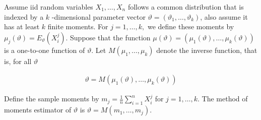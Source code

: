 \documentclass[ 11pt,%
				a4paper,%
				twoside,%
				headinclude,%
				footinclude = true,%
				cleardoublepage = empty,%
				reqno]{scrbook}
\begin{document}

  

\begin{definition}

Assume iid random variables $X_{1}, \ldots, X_{n}$ follows a common distribution that is indexed by a $k$ -dimensional parameter vector $\vartheta = (\vartheta_{1}, \ldots, \vartheta_{k})$, also assume it has at least $k$ finite moments. For $j=1, \ldots, k,$ we define these moments by $\mu_{j}(\vartheta)=E_{\vartheta}\left(X_{i}^{j}\right)$. Suppose that the function $\mu(\vartheta)=\left(\mu_{1}(\vartheta), \ldots, \mu_{k}(\vartheta)\right)$ is a one-to-one function of $\vartheta$. Let $M\left(\mu_{1}, \ldots, \mu_{k}\right)$ denote the inverse function, that is, for all $\vartheta$

\begin{align*}
  \vartheta=M\left(\mu_{1}(\vartheta), \ldots, \mu_{k}(\vartheta)\right)
\end{align*}

Define the sample moments by $m_{j}=\frac{1}{n} \sum_{i=1}^{n} X_{i}^{j}$ for $j=1, \ldots, k .$ The method of moments estimator of $\vartheta$ is $\hat{\vartheta} =M\left(m_{1}, \ldots, m_{j}\right)$.

\end{definition}

\end{document}
